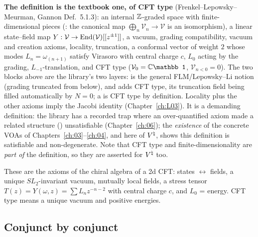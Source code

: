 \begin{dictionary}
\textbf{The definition is the textbook one, of CFT type} (Frenkel--Lepowsky--Meurman, Gannon Def.~5.1.3): an internal
${\mathbb{Z}}$-graded space with finite-dimensional pieces (: the canonical map
$\bigoplus_n\mathcal V_n\to\mathcal V$ is an isomorphism), a linear state--field map
$Y:\mathcal V\to\operatorname{End}(\mathcal V)[[z^{\pm1}]]$, a vacuum, grading compatibility, vacuum and creation axioms,
locality, truncation, a conformal vector of weight $2$ whose modes $L_n=\omega_{(n+1)}$ satisfy Virasoro with
central charge $c$, $L_0$ acting by the grading, $L_{-1}$-translation, and CFT type
($\mathcal V_0=\C\mathbb 1$, $\mathcal V_{n<0}=0$).  The two blocks above are the library's two layers:
 is the general FLM/Lepowsky--Li notion (grading truncated from below), and
 adds CFT type, its truncation field being filled automatically by $N=0$; a
 is CFT type by definition.  Locality plus the other axioms imply the Jacobi
identity (Chapter~\ref{ch:L03}).  It is a demanding definition: the library has a recorded trap where an
over-quantified axiom made a related structure () unsatisfiable
(Chapter~\ref{ch:06}); the \emph{existence} of the concrete VOAs of Chapters~\ref{ch:03}--\ref{ch:04}, and
here of ${V^{\natural}}$, shows this definition is satisfiable and non-degenerate.  Note that CFT type and
finite-dimensionality are \emph{part of} the definition, so they are asserted for ${V^{\natural}}$ too.
\end{dictionary}

\begin{physics}
These are the axioms of the chiral algebra of a 2d CFT: states $\leftrightarrow$ fields, a unique
$SL_2$-invariant vacuum, mutually local fields, a stress tensor $T(z)=Y(\omega,z)=\sum L_nz^{-n-2}$ with
central charge $c$, and $L_0$ = energy.  CFT type means a unique vacuum and positive energies.
\end{physics}

\subsection{Conjunct by conjunct}

